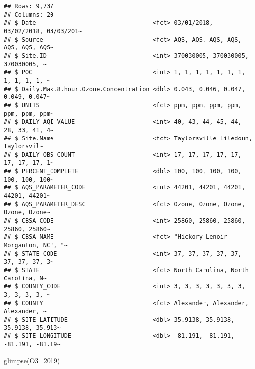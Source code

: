 \documentclass[
]{article}
\newenvironment{Shaded}{\begin{snugshade}}{\end{snugshade}}
\newcommand{\FunctionTok}[1]{\textcolor[rgb]{0.00,0.00,0.00}{#1}}
\newcommand{\NormalTok}[1]{#1}
\begin{document}
\begin{verbatim}
## Rows: 9,737
## Columns: 20
## $ Date                                 <fct> 03/01/2018, 03/02/2018, 03/03/201~
## $ Source                               <fct> AQS, AQS, AQS, AQS, AQS, AQS, AQS~
## $ Site.ID                              <int> 370030005, 370030005, 370030005, ~
## $ POC                                  <int> 1, 1, 1, 1, 1, 1, 1, 1, 1, 1, 1, ~
## $ Daily.Max.8.hour.Ozone.Concentration <dbl> 0.043, 0.046, 0.047, 0.049, 0.047~
## $ UNITS                                <fct> ppm, ppm, ppm, ppm, ppm, ppm, ppm~
## $ DAILY_AQI_VALUE                      <int> 40, 43, 44, 45, 44, 28, 33, 41, 4~
## $ Site.Name                            <fct> Taylorsville Liledoun, Taylorsvil~
## $ DAILY_OBS_COUNT                      <int> 17, 17, 17, 17, 17, 17, 17, 17, 1~
## $ PERCENT_COMPLETE                     <dbl> 100, 100, 100, 100, 100, 100, 100~
## $ AQS_PARAMETER_CODE                   <int> 44201, 44201, 44201, 44201, 44201~
## $ AQS_PARAMETER_DESC                   <fct> Ozone, Ozone, Ozone, Ozone, Ozone~
## $ CBSA_CODE                            <int> 25860, 25860, 25860, 25860, 25860~
## $ CBSA_NAME                            <fct> "Hickory-Lenoir-Morganton, NC", "~
## $ STATE_CODE                           <int> 37, 37, 37, 37, 37, 37, 37, 37, 3~
## $ STATE                                <fct> North Carolina, North Carolina, N~
## $ COUNTY_CODE                          <int> 3, 3, 3, 3, 3, 3, 3, 3, 3, 3, 3, ~
## $ COUNTY                               <fct> Alexander, Alexander, Alexander, ~
## $ SITE_LATITUDE                        <dbl> 35.9138, 35.9138, 35.9138, 35.913~
## $ SITE_LONGITUDE                       <dbl> -81.191, -81.191, -81.191, -81.19~
\end{verbatim}

\begin{Shaded}
\begin{Highlighting}[]
\FunctionTok{glimpse}\NormalTok{(O3\_2019)}
\end{Highlighting}
\end{Shaded}
\end{document}
